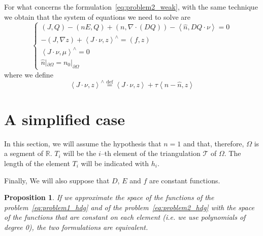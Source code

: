 \documentclass[a4paper,11pt, draft]{article}
\newtheorem{prop}{Proposition}
\newcommand{\Def}{\stackrel{\mathrm{def}}{=}}
\begin{document}
For what concerns the formulation~\ref{eq:problem2_weak}, with the same technique we obtain that 
the system of equations we need to solve are
\begin{equation}\label{eq:problem2_hdg}
\begin{cases}
 (J, Q) - (n E, Q) + (n, \nabla \cdot (D Q)) - \left<\widehat{n}, DQ \cdot \nu \right> = 0 \\
 - (J, \nabla z) + \left<J \cdot \nu, z \right>^{\wedge} = (f, z) \\
   \left<J \cdot \nu, \mu \right>^{\wedge} = 0 \\
   \widehat{n}|_{\partial \Omega} = n_0 |_{\partial \Omega}
\end{cases} 
\end{equation}
where we define
\[
  \left<J \cdot \nu, z \right>^{\wedge} \Def \left<J \cdot \nu, z \right> + \tau \left<n - 
\widehat{n}, z\right>
\]

\section{A simplified case}
In this section, we will assume the hypothesis that $n = 1$ and that, therefore, $\Omega$ is a 
segment of $\mathbb{R}$.
$T_i$ will be the $i$--th element of the triangulation $\mathcal{T}$ of $\Omega$. The length of 
the element $T_i$ will be indicated with $h_i$.

Finally, We will also suppose that $D$, $E$ and $f$ are constant functions.


\begin{prop}
If we approximate the space of the functions of the problem~\ref{eq:problem1_hdg} and of the 
problem~\ref{eq:problem2_hdg} with the space of the functions that are constant on each element 
(i.e. we use polynomials of degree 0), the two formulations are equivalent.
\end{prop}
\end{document}
